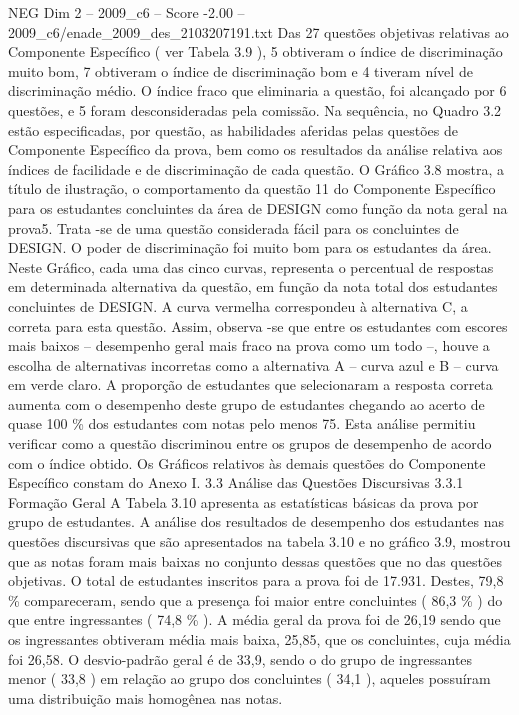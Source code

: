 \begin{textsample}{NEG Dim 2 – 2009\_c6 – Score -2.00 – 2009\_c6/enade\_2009\_des\_2103207191.txt}
Das 27 questões objetivas relativas ao Componente Específico ( ver Tabela 3.9 ), 5 obtiveram o índice de discriminação muito bom, 7 obtiveram o índice de discriminação bom e 4 tiveram nível de discriminação médio.
O índice fraco que eliminaria a questão, foi alcançado por 6 questões, e 5 foram desconsideradas pela comissão.
Na sequência, no Quadro 3.2 estão especificadas, por questão, as habilidades aferidas pelas questões de Componente Específico da prova, bem como os resultados da análise relativa aos índices de facilidade e de discriminação de cada questão.
O Gráfico 3.8 mostra, a título de ilustração, o comportamento da questão 11 do Componente Específico para os estudantes concluintes da área de DESIGN como função da nota geral na prova5.
Trata -se de uma questão considerada fácil para os concluintes de DESIGN.
O poder de discriminação foi muito bom para os estudantes da área.
Neste Gráfico, cada uma das cinco curvas, representa o percentual de respostas em determinada alternativa da questão, em função da nota total dos estudantes concluintes de DESIGN.
A curva vermelha correspondeu à alternativa C, a correta para esta questão.
Assim, observa -se que entre os estudantes com escores mais baixos – desempenho geral mais fraco na prova como um todo –, houve a escolha de alternativas incorretas como a alternativa A – curva azul e B – curva em verde claro.
A proporção de estudantes que selecionaram a resposta correta aumenta com o desempenho deste grupo de estudantes chegando ao acerto de quase 100 \% dos estudantes com notas pelo menos 75.
Esta análise permitiu verificar como a questão discriminou entre os grupos de desempenho de acordo com o índice obtido.
Os Gráficos relativos às demais questões do Componente Específico constam do Anexo I. 3.3 Análise das Questões Discursivas 3.3.1 Formação Geral A Tabela 3.10 apresenta as estatísticas básicas da prova por grupo de estudantes.
A análise dos resultados de desempenho dos estudantes nas questões discursivas que são apresentados na tabela 3.10 e no gráfico 3.9, mostrou que as notas foram mais baixas no conjunto dessas questões que no das questões objetivas.
O total de estudantes inscritos para a prova foi de 17.931.
Destes, 79,8 \% compareceram, sendo que a presença foi maior entre concluintes ( 86,3 \% ) do que entre ingressantes ( 74,8 \% ).
A média geral da prova foi de 26,19 sendo que os ingressantes obtiveram média mais baixa, 25,85, que os concluintes, cuja média foi 26,58.
O desvio-padrão geral é de 33,9, sendo o do grupo de ingressantes menor ( 33,8 ) em relação ao grupo dos concluintes ( 34,1 ), aqueles possuíram uma distribuição mais homogênea nas notas.

\end{textsample}
